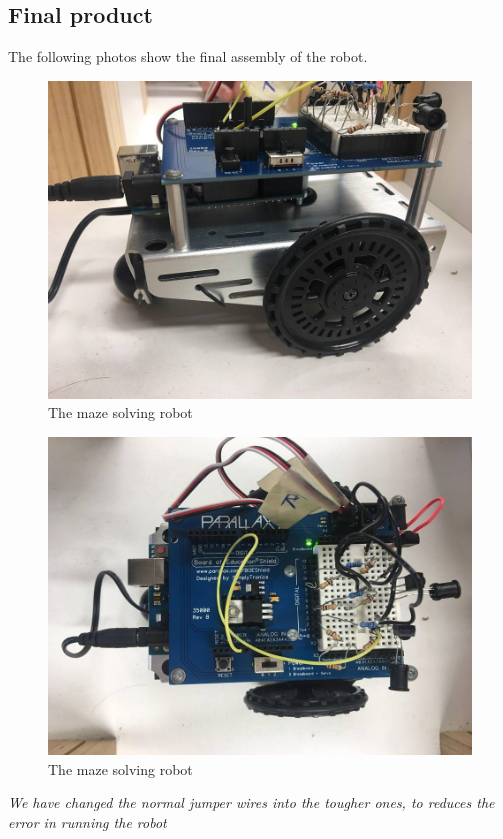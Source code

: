 \documentclass{article}
\begin{document}
\subsection{Final product}
The following photos show the final assembly of the robot.\\
\begin{figure}[h!]
	\centering
	\includegraphics[width=400pt]{pic4.jpg}
	\caption{The maze solving robot}
\end{figure}
\begin{figure}[h!]
	\centering
	\includegraphics[width=400pt]{pic5.jpg}
	\caption{The maze solving robot}
\end{figure}
\textit{We have changed the normal jumper wires into the tougher ones, to reduces the error in running the robot}
\newpage
\end{document}
